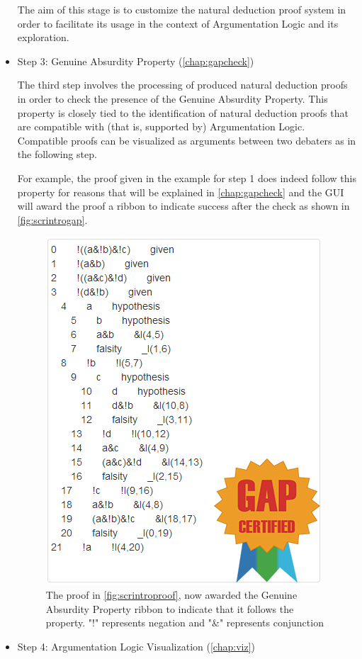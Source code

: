 \documentclass[11pt,twoside,a4paper]{report}
\begin{document}
\begin{itemize}
The aim of this stage is to customize the natural deduction proof system in order to facilitate its usage in the context of Argumentation Logic and its exploration.
\item
Step 3: Genuine Absurdity Property (\autoref{chap:gapcheck})

The third step involves the processing of produced natural deduction proofs in order to check the presence of the Genuine Absurdity Property. This property is closely tied to the identification of natural deduction proofs that are compatible with (that is, supported by) Argumentation Logic. Compatible proofs can be visualized as arguments between two debaters as in the following step.

For example, the proof given in the example for step 1 does indeed follow this property for reasons that will be explained in \autoref{chap:gapcheck} and the GUI will award the proof a ribbon to indicate success after the check as shown in \autoref{fig:scrintrogap}.

\begin{figure}[htp]
\centerline{\includegraphics[scale=0.4]{img/scr-intro-gap.png}}
\caption{The proof in \autoref{fig:scrintroproof}, now awarded the Genuine Absurdity Property ribbon to indicate that it follows the property. "!" represents negation and "\&" represents conjunction\label{fig:scrintrogap}}
\end{figure}
\item
Step 4: Argumentation Logic Visualization (\autoref{chap:viz})


\end{itemize}
\end{document}
